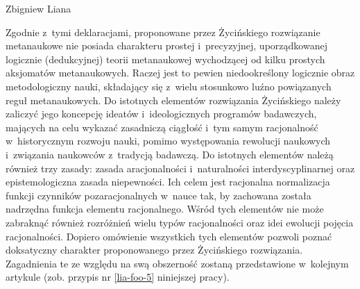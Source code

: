 \begin{artplenv}{Zbigniew Liana}

Zgodnie z~tymi deklaracjami, proponowane przez Życińskiego rozwiązanie metanaukowe nie posiada charakteru
prostej i~precyzyjnej, uporządkowanej logicznie (dedukcyjnej) teorii metanaukowej wychodzącej od kilku prostych aksjomatów
metanaukowych. Raczej jest to pewien niedookreślony logicznie obraz metodologiczny nauki, składający się z~wielu
stosunkowo luźno powiązanych reguł metanaukowych. Do istotnych elementów rozwiązania Życińskiego należy zaliczyć jego
koncepcję ideatów i~ideologicznych programów badawczych, mających na celu wykazać zasadniczą ciągłość i~tym samym
racjonalność w~historycznym rozwoju nauki, pomimo występowania rewolucji naukowych i~związania naukowców z~tradycją
badawczą. Do istotnych elementów należą również trzy zasady: zasada aracjonalności i~naturalności interdyscyplinarnej
oraz epistemologiczna zasada niepewności. Ich celem jest racjonalna normalizacja funkcji czynników
pozaracjonalnych w~nauce tak, by zachowana została nadrzędna funkcja elementu racjonalnego.
Wśród tych elementów nie może zabraknąć
również rozróżnień wielu typów racjonalności oraz idei ewolucji pojęcia racjonalności. Dopiero omówienie wszystkich
tych elementów pozwoli poznać doksatyczny charakter proponowanego przez Życińskiego rozwiązania. Zagadnienia te ze
względu na swą obszerność zostaną przedstawione w~kolejnym artykule (zob. przypis nr \ref{lia-foo-5} niniejszej pracy).


\end{artplenv}
